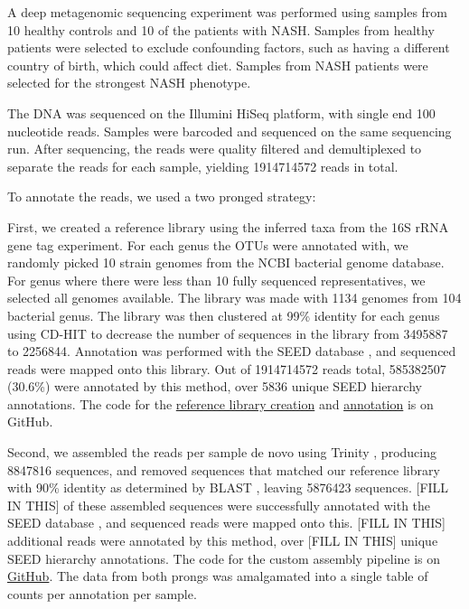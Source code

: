 A deep metagenomic sequencing experiment was performed using samples from 10 healthy controls and 10 of the patients with NASH. Samples from healthy patients were selected to exclude confounding factors, such as having a different country of birth, which could affect diet. Samples from NASH patients were selected for the strongest NASH phenotype.

The DNA was sequenced on the Illumini HiSeq platform, with single end 100 nucleotide reads. Samples were barcoded and sequenced on the same sequencing run. After sequencing, the reads were quality filtered and demultiplexed to separate the reads for each sample, yielding 1914714572 reads in total.

To annotate the reads, we used a two pronged strategy:

First, we created a reference library using the inferred taxa from the 16S rRNA gene tag experiment. For each genus the OTUs were annotated with, we randomly picked 10 strain genomes from the NCBI bacterial genome database. For genus where there were less than 10 fully sequenced representatives, we selected all genomes available. The library was made with 1134 genomes from 104 bacterial genus. The library was then clustered at 99\% identity for each genus using CD-HIT \cite{li2006cd} to decrease the number of sequences in the library from 3495887 to 2256844. Annotation was performed with the SEED database \cite{overbeek2005subsystems}, and sequenced reads were mapped onto this library. Out of 1914714572 reads total, 585382507 (30.6\%) were annotated by this method, over 5836 unique SEED hierarchy annotations. The code for the \href{https://github.com/ruthgrace/make_functional_mapping_library}{reference library creation} and \href{https://github.com/ruthgrace/mapping_library_annotated_counts}{annotation} is on GitHub.

Second, we assembled the reads per sample de novo using Trinity \cite{haas2013novo}, producing 8847816 sequences, and removed sequences that matched our reference library with 90\% identity as determined by BLAST \cite{altschul1990basic}, leaving 5876423 sequences. [FILL IN THIS] of these assembled sequences were successfully annotated with the SEED database \cite{overbeek2005subsystems}, and sequenced reads were mapped onto this. [FILL IN THIS] additional reads were annotated by this method, over [FILL IN THIS] unique SEED hierarchy annotations. The code for the custom assembly pipeline is on \href{https://github.com/ruthgrace/exploring_nafld_assembly}{GitHub}. The data from both prongs was amalgamated into a single table of counts per annotation per sample.

